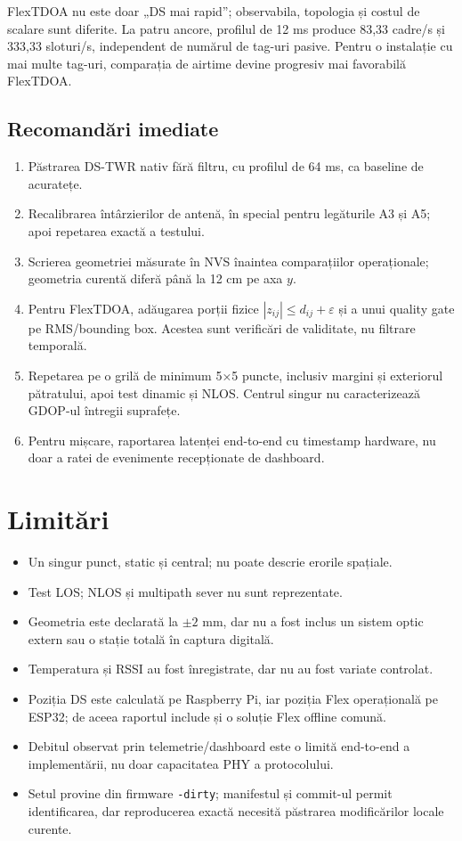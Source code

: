 \documentclass[11pt,a4paper]{article}
\begin{document}
FlexTDOA nu este doar „DS mai rapid”; observabila, topologia și costul de
scalare sunt diferite. La patru ancore, profilul de 12 ms produce 83,33 cadre/s
și 333,33 sloturi/s, independent de numărul de tag-uri pasive. Pentru o
instalație cu mai multe tag-uri, comparația de airtime devine progresiv mai
favorabilă FlexTDOA.

\subsection{Recomandări imediate}

\begin{enumerate}[leftmargin=7mm]
  \item Păstrarea DS-TWR nativ fără filtru, cu profilul de 64 ms, ca baseline
  de acuratețe.
  \item Recalibrarea întârzierilor de antenă, în special pentru legăturile A3
  și A5; apoi repetarea exactă a testului.
  \item Scrierea geometriei măsurate în NVS înaintea comparațiilor
  operaționale; geometria curentă diferă până la 12 cm pe axa $y$.
  \item Pentru FlexTDOA, adăugarea porții fizice
  $|z_{ij}|\leq d_{ij}+\varepsilon$ și a unui quality gate pe RMS/bounding box.
  Acestea sunt verificări de validitate, nu filtrare temporală.
  \item Repetarea pe o grilă de minimum 5×5 puncte, inclusiv margini și
  exteriorul pătratului, apoi test dinamic și NLOS. Centrul singur nu
  caracterizează GDOP-ul întregii suprafețe.
  \item Pentru mișcare, raportarea latenței end-to-end cu timestamp hardware,
  nu doar a ratei de evenimente recepționate de dashboard.
\end{enumerate}

\section{Limitări}

\begin{itemize}[leftmargin=6mm]
  \item Un singur punct, static și central; nu poate descrie erorile spațiale.
  \item Test LOS; NLOS și multipath sever nu sunt reprezentate.
  \item Geometria este declarată la $\pm2$ mm, dar nu a fost inclus un sistem
  optic extern sau o stație totală în captura digitală.
  \item Temperatura și RSSI au fost înregistrate, dar nu au fost variate
  controlat.
  \item Poziția DS este calculată pe Raspberry Pi, iar poziția Flex operațională
  pe ESP32; de aceea raportul include și o soluție Flex offline comună.
  \item Debitul observat prin telemetrie/dashboard este o limită
  end-to-end a implementării, nu doar capacitatea PHY a protocolului.
  \item Setul provine din firmware \texttt{-dirty}; manifestul și commit-ul
  permit identificarea, dar reproducerea exactă necesită păstrarea modificărilor
  locale curente.
\end{itemize}
\end{document}
